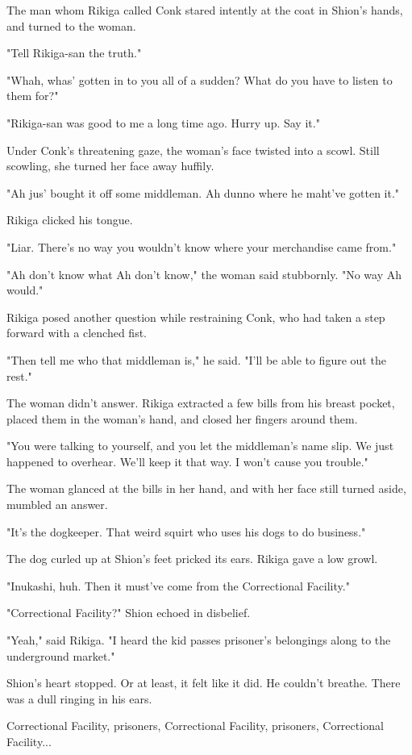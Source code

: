 The man whom Rikiga called Conk stared intently at the coat in Shion's
hands, and turned to the woman.

"Tell Rikiga-san the truth."

"Whah, whas' gotten in to you all of a sudden? What do you have to
listen to them for?"

"Rikiga-san was good to me a long time ago. Hurry up. Say it."

Under Conk's threatening gaze, the woman's face twisted into a scowl.
Still scowling, she turned her face away huffily.

"Ah jus' bought it off some middleman. Ah dunno where he maht've gotten
it."

Rikiga clicked his tongue.

"Liar. There's no way you wouldn't know where your merchandise came
from."

"Ah don't know what Ah don't know," the woman said stubbornly. "No way
Ah would."

Rikiga posed another question while restraining Conk, who had taken a
step forward with a clenched fist.

"Then tell me who that middleman is," he said. "I'll be able to figure
out the rest."

The woman didn't answer. Rikiga extracted a few bills from his breast
pocket, placed them in the woman's hand, and closed her fingers around
them.

"You were talking to yourself, and you let the middleman's name slip. We
just happened to overhear. We'll keep it that way. I won't cause you
trouble."

The woman glanced at the bills in her hand, and with her face still
turned aside, mumbled an answer.

"It's the dogkeeper. That weird squirt who uses his dogs to do
business."

The dog curled up at Shion's feet pricked its ears. Rikiga gave a low
growl.

"Inukashi, huh. Then it must've come from the Correctional Facility."

"Correctional Facility?" Shion echoed in disbelief.

"Yeah," said Rikiga. "I heard the kid passes prisoner's belongings along
to the underground market."

Shion's heart stopped. Or at least, it felt like it did. He couldn't
breathe. There was a dull ringing in his ears.

Correctional Facility, prisoners, Correctional Facility, prisoners,
Correctional Facility...

